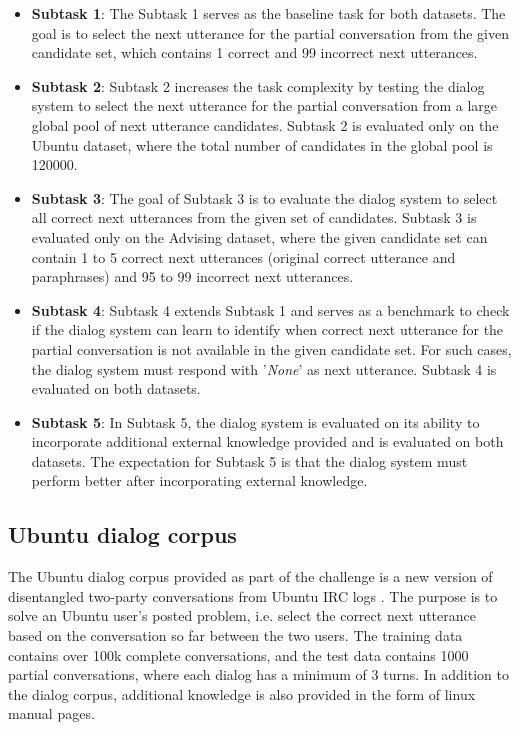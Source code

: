 \documentclass[letterpaper]{article} %
\begin{document}
\begin{itemize}
    \item \textbf{Subtask 1}: The Subtask 1 serves as the baseline task for both datasets. The goal is to select the next utterance for the partial conversation from the given candidate set, which contains 1 correct and 99 incorrect next utterances.
    
    \item \textbf{Subtask 2}: Subtask 2 increases the task complexity by testing the dialog system to select the next utterance for the partial conversation from a large global pool of next utterance candidates. Subtask 2 is evaluated only on the Ubuntu dataset, where the total number of candidates in the global pool is 120000.
    
    \item \textbf{Subtask 3}: The goal of Subtask 3 is to evaluate the dialog system to select all correct next utterances from the given set of candidates. Subtask 3 is evaluated only on the Advising dataset, where the given candidate set can contain 1 to 5 correct next utterances (original correct utterance and paraphrases) and 95 to 99 incorrect next utterances.
    
    \item \textbf{Subtask 4}: Subtask 4 extends Subtask 1 and serves as a benchmark to check if the dialog system can learn to identify when correct next utterance for the partial conversation is not available in the given candidate set. For such cases, the dialog system must respond with '\textit{None}' as next utterance. Subtask 4 is evaluated on both datasets.
    
    \item \textbf{Subtask 5}: In Subtask 5, the dialog system is evaluated on its ability to incorporate additional external knowledge provided and is evaluated on both datasets. The expectation for Subtask 5 is that the dialog system must perform better after incorporating external knowledge.
\end{itemize}

\subsection{Ubuntu dialog corpus}
\label{Ubuntu-dialog-corpus}
The Ubuntu dialog corpus provided as part of the challenge is a new version of disentangled two-party conversations from Ubuntu IRC logs \cite{kummerfeld2018analyzing}. The purpose is to solve an Ubuntu user's posted problem, i.e. select the correct next utterance based on the conversation so far between the two users. The training data contains over 100k complete conversations, and the test data contains 1000 partial conversations, where each dialog has a minimum of 3 turns. In addition to the dialog corpus, additional knowledge is also provided in the form of linux manual pages.
\end{document}

